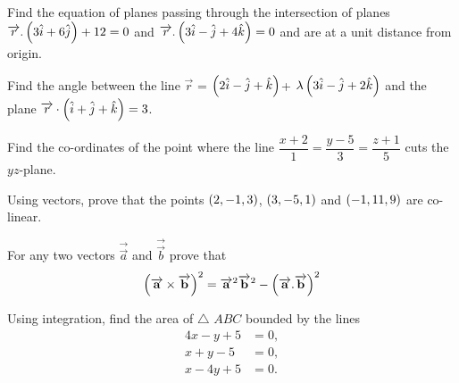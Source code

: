\item Find the equation of planes passing through the intersection of planes$ \overrightarrow r.\left(3\hat{i}+6\hat{j}\right)+12=0$ and $ \overrightarrow {r}.\left(3\hat{i}-\hat{j}+4\hat{k}\right)=0$ and are at a unit distance from origin.                         
\item  Find the angle between the line $\overrightarrow{r}$ = $\left(2\hat{i}-\hat{j}+\hat{k}\right)$+ $\lambda\left(3\hat{i}-\hat{j}+2\hat{k}\right)$ and the plane $\overrightarrow{r}\cdot\left(\hat{i} +\hat{j}+\hat{k}\right)=3$.
\item Find the co-ordinates of the point where the line $\dfrac{x+2}{1}=\dfrac{y-5}{3}=\dfrac{z+1}{5}$ cuts the $yz$-plane.
\item Using vectors, prove that the points $\left(2,-1,3\right)$, $\left(3,-5,1\right)$ and $\left(-1,11,9\right)$ are co-linear.
\item For any two vectors $\overrightarrow{\vec{a}}$ and $\overrightarrow{\vec{b}}$ prove that 
	\begin{align*}	\left(\overrightarrow{\mathbf{a}}\times\overrightarrow{\mathbf{b}}\right)^{2}=\overrightarrow{\mathbf{a}}^{2}\overrightarrow{\mathbf{b}}^{2}-\left(\overrightarrow{\mathbf{a}}.\overrightarrow{\mathbf{b}}\right)^{2}
	\end{align*}                 
 \item Using integration, find the area of $\triangle$ $ABC$ bounded by the lines
\begin{align*}
4x-y+5&=0,\\x+y-5&=0,\\x-4y+5&=0.
\end{align*} 

